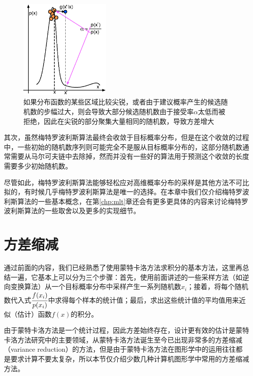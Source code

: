 \begin{figure}
	\sidecaption
	\includegraphics[width=0.4\textwidth]{figures/mc/metropolis-1}
	\caption{如果分布函数的某些区域比较尖锐，或者由于建议概率产生的候选随机数的步幅过大，则会导致大部分候选随机数由于接受率$\alpha$太低而被拒绝，因此在尖锐的部分聚集大量相同的随机数，导致方差增大}
	\label{f:mc-met-1}
\end{figure}

其次，虽然梅特罗波利斯算法最终会收敛于目标概率分布，但是在这个收敛的过程中，一些初始的随机数序列则可能完全不是服从目标概率分布的，这部分随机数通常需要从马尔可夫链中去除掉，然而并没有一些好的算法用于预测这个收敛的长度需要多少初始随机数。

尽管如此，梅特罗波利斯算法能够轻松应对高维概率分布的采样是其他方法不可比拟的，有时候几乎梅特罗波利斯算法是唯一的选择。在本章中我们仅介绍梅特罗波利斯算法的一些基本概念，在第\ref{chp:mlt}章还会有更多更具体的内容来讨论梅特罗波利斯算法的一些取舍以及更多的实现细节。





\section{方差缩减}\label{sec:Variance-Reduction}
通过前面的内容，我们已经熟悉了使用蒙特卡洛方法求积分的基本方法，这里再总结一遍，它基本上可以分为三个步骤：首先，使用前面讲述的一些采样方法（如逆向变换算法）从一个目标概率分布中采样产生一系列随机数$x_i$；接着，将每个随机数代入式$ \cfrac{f(x_i)}{p(x_i)}$中求得每个样本的统计值；最后，求出这些统计值的平均值用来近似（估计）函数$f(x)$的积分。

由于蒙特卡洛方法是一个统计过程，因此方差始终存在，设计更有效的估计是蒙特卡洛方法研究中的主要领域，从蒙特卡洛方法诞生至今已出现非常多的方差缩减（variance reduction）的方法，但是由于蒙特卡洛方法在图形学中的运用往往都是要求计算不要太复杂，所以本节仅介绍少数几种计算机图形学中常用的方差缩减方法。





